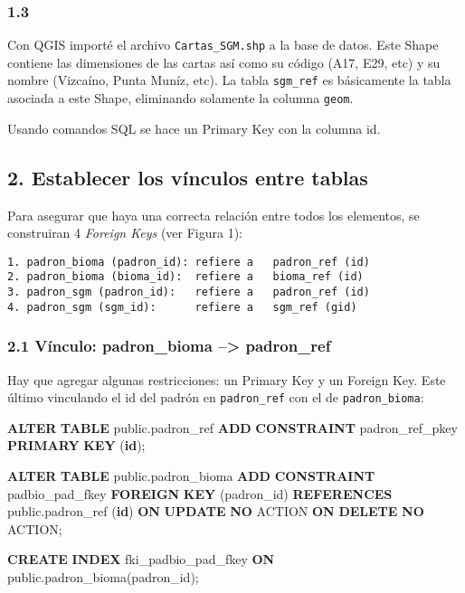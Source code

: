 \documentclass[spanish,]{article}
\newenvironment{Shaded}{}{}
\newcommand{\KeywordTok}[1]{\textcolor[rgb]{0.00,0.44,0.13}{\textbf{{#1}}}}
\newcommand{\NormalTok}[1]{{#1}}
\begin{document}
\subsubsection{1.3}\label{section}

Con QGIS importé el archivo \texttt{Cartas\_SGM.shp} a la base de datos.
Este Shape contiene las dimensiones de las cartas así como su código
(A17, E29, etc) y su nombre (Vizcaíno, Punta Muníz, etc). La tabla
\texttt{sgm\_ref} es básicamente la tabla asociada a este Shape,
eliminando solamente la columna \texttt{geom}.

Usando comandos SQL se hace un Primary Key con la columna id.

\subsection{2. Establecer los vínculos entre
tablas}\label{establecer-los-vuxednculos-entre-tablas}

Para asegurar que haya una correcta relación entre todos los elementos,
se construiran 4 \emph{Foreign Keys} (ver Figura 1):

\begin{verbatim}
1. padron_bioma (padron_id): refiere a   padron_ref (id)
2. padron_bioma (bioma_id):  refiere a   bioma_ref (id)
3. padron_sgm (padron_id):   refiere a   padron_ref (id)
4. padron_sgm (sgm_id):      refiere a   sgm_ref (gid)
\end{verbatim}

\subsubsection{2.1 Vínculo: padron\_bioma --\textgreater{}
padron\_ref}\label{vuxednculo-padronux5fbioma-padronux5fref}

Hay que agregar algunas restricciones: un Primary Key y un Foreign Key.
Este último vinculando el id del padrón en \texttt{padron\_ref} con el
de \texttt{padron\_bioma}:

\begin{Shaded}
\begin{Highlighting}[]
\KeywordTok{ALTER} \KeywordTok{TABLE} \NormalTok{public.padron_ref}
  \KeywordTok{ADD} \KeywordTok{CONSTRAINT} \NormalTok{padron_ref_pkey }\KeywordTok{PRIMARY} \KeywordTok{KEY} \NormalTok{(}\KeywordTok{id}\NormalTok{);}

\KeywordTok{ALTER} \KeywordTok{TABLE} \NormalTok{public.padron_bioma}
  \KeywordTok{ADD} \KeywordTok{CONSTRAINT} \NormalTok{padbio_pad_fkey }\KeywordTok{FOREIGN} \KeywordTok{KEY} \NormalTok{(padron_id) }\KeywordTok{REFERENCES} 
      \NormalTok{public.padron_ref (}\KeywordTok{id}\NormalTok{)}
   \KeywordTok{ON} \KeywordTok{UPDATE} \KeywordTok{NO} \NormalTok{ACTION }\KeywordTok{ON} \KeywordTok{DELETE} \KeywordTok{NO} \NormalTok{ACTION;}

\KeywordTok{CREATE} \KeywordTok{INDEX} \NormalTok{fki_padbio_pad_fkey}
    \KeywordTok{ON} \NormalTok{public.padron_bioma(padron_id);}
\end{Highlighting}
\end{Shaded}
\end{document}
